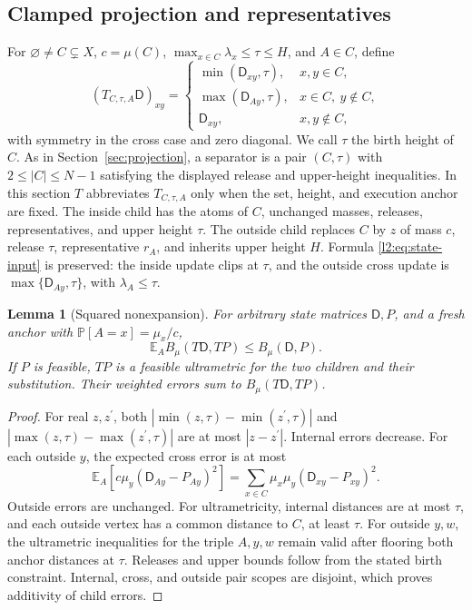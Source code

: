 \documentclass[11pt]{article}
\newtheorem{lemma}[theorem]{Lemma}
\theoremstyle{definition}
\newcommand{\E}{\mathbb E}
\newcommand{\Prb}{\mathbb P}
\begin{document}
\subsection{Clamped projection and representatives}

For $\varnothing\ne C\subsetneq X$, $c=\mu(C)$,
$\max_{x\in C}\lambda_x\le\tau\le H$, and $A\in C$, define
\[
 (T_{C,\tau,A}\mathsf D)_{xy}=
 \begin{cases}
 \min(\mathsf D_{xy},\tau),&x,y\in C,\\
 \max(\mathsf D_{Ay},\tau),&x\in C,\ y\notin C,\\
 \mathsf D_{xy},&x,y\notin C,
 \end{cases}
\]
with symmetry in the cross case and zero diagonal. We call $\tau$ the
birth height of $C$. As in Section~\ref{sec:projection}, a separator
is a pair $(C,\tau)$ with $2\le |C|\le N-1$ satisfying the displayed
release and upper-height inequalities. In this section $T$ abbreviates $T_{C,\tau,A}$ only when the set, height, and execution anchor are fixed.
The inside child has the atoms of $C$, unchanged masses, releases,
representatives, and upper height $\tau$. The outside child replaces
$C$ by $z$ of mass $c$, release $\tau$, representative $r_A$, and
inherits upper height $H$. Formula \eqref{l2:eq:state-input} is preserved:
the inside update clips at $\tau$, and the outside cross update is
$\max\{\mathsf D_{Ay},\tau\}$, with $\lambda_A\le\tau$.

\begin{lemma}[Squared nonexpansion]\label{l2:lem:nonexpand}
For arbitrary state matrices $\mathsf D,P$, and a fresh anchor with
$\Prb[A=x]=\mu_x/c$,
\[
 \E_A B_\mu(T\mathsf D,TP)\le B_\mu(\mathsf D,P).
\]
If $P$ is feasible, $TP$ is a feasible ultrametric for the two children
and their substitution. Their weighted errors sum to $B_\mu(T\mathsf D,TP)$.
\end{lemma}
\begin{proof}
For real $z,z^\prime$, both $|\min(z,\tau)-\min(z^\prime,\tau)|$ and $|\max(z,\tau)-\max(z^\prime,\tau)|$ are at most $|z-z^\prime|$. Internal errors decrease.
For each outside $y$, the expected cross error is at most
\[
 \E_A[c\mu_y(\mathsf D_{Ay}-P_{Ay})^2]
 =\sum_{x\in C}\mu_x\mu_y(\mathsf D_{xy}-P_{xy})^2.
\]
Outside errors are unchanged. For ultrametricity, internal distances
are at most $\tau$, and each outside vertex has a common distance to
$C$, at least $\tau$. For outside $y,w$, the ultrametric inequalities
for the triple $A,y,w$ remain valid after flooring both anchor
distances at $\tau$. Releases and upper bounds follow from the stated
birth constraint. Internal, cross, and outside pair scopes are disjoint,
which proves additivity of child errors.
\end{proof}
\end{document}

